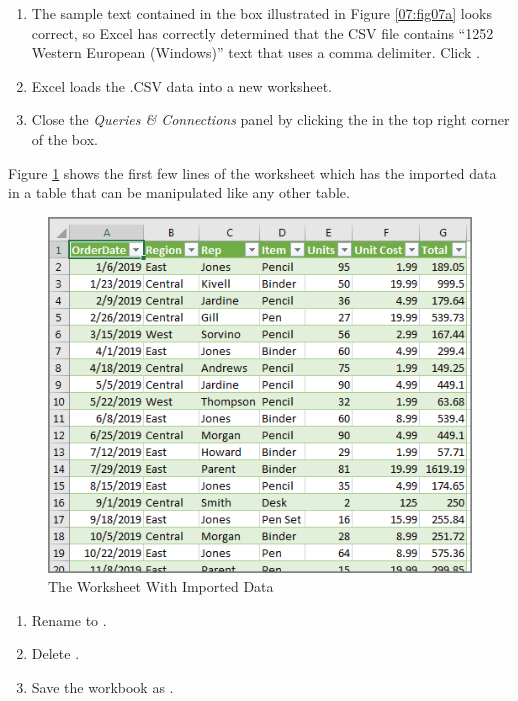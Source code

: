 \begin{enumbox}
\begin{enumerate}
		\item The sample text contained in the box illustrated in Figure \ref{07:fig07a} looks correct, so Excel has correctly determined that the CSV file contains ``1252 Western European (Windows)'' text that uses a comma delimiter. Click .
		\item Excel loads the .CSV data into a new worksheet.
		\item Close the \textit{Queries \& Connections} panel by clicking the  in the top right corner of the box.
	\end{enumerate}
\end{enumbox}

Figure \ref{07:fig10} shows the first few lines of the worksheet which has the imported data in a table that can be manipulated like any other table.

\begin{figure}[H]
	\centering
	\includegraphics[width=\maxwidth{.95\linewidth}]{gfx/ch07_fig10}
	\caption{The Worksheet With Imported Data}
	\label{07:fig10}
\end{figure}

\begin{enumbox}
	\begin{enumerate}
		\item Rename  to .
		\item Delete .
		\item Save the workbook as .
	\end{enumerate}
\end{enumbox}
	
